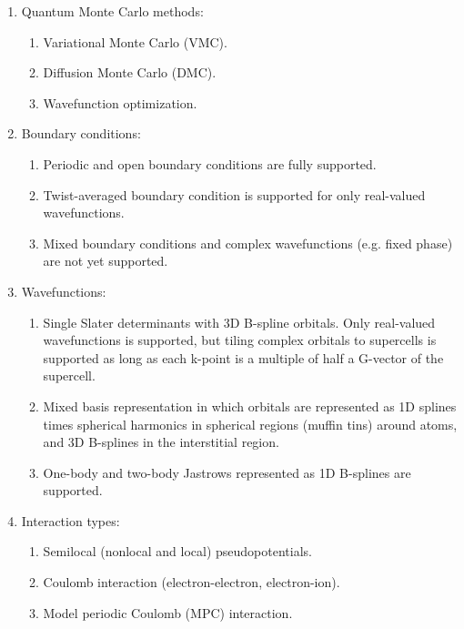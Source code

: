 \begin{enumerate}

  \item Quantum Monte Carlo methods:

    \begin{enumerate}
	\item Variational Monte Carlo (VMC).
	\item Diffusion Monte Carlo (DMC).
	\item Wavefunction optimization.
    \end{enumerate}

  \item Boundary conditions:

    \begin{enumerate}
	\item Periodic and open boundary conditions are fully supported.
	\item Twist-averaged boundary condition is supported for only real-valued wavefunctions.
	\item Mixed boundary conditions and complex wavefunctions (e.g. fixed phase) are not yet supported.
    \end{enumerate}

  \item Wavefunctions:

    \begin{enumerate}
	\item Single Slater determinants with 3D B-spline orbitals. Only real-valued wavefunctions is supported, but tiling complex orbitals to supercells is supported as long as each k-point is a multiple of half a G-vector of the supercell.
	\item Mixed basis representation in which orbitals are represented as 1D splines times spherical harmonics in spherical regions (muffin tins) around atoms, and 3D B-splines in the interstitial region.
	\item One-body and two-body Jastrows represented as 1D B-splines are supported. %
    \end{enumerate}

  \item Interaction types:

    \begin{enumerate}
	\item Semilocal (nonlocal and local) pseudopotentials.
	\item Coulomb interaction (electron-electron, electron-ion).
	\item Model periodic Coulomb (MPC) interaction.
    \end{enumerate}

\end{enumerate}

